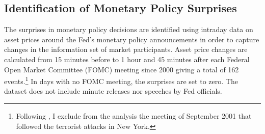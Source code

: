 {\subsection{Identification of Monetary Policy Surprises} \label{sec:USMPS}
\iftoggle{toclinks}{\gototoc}{} %


The surprises in monetary policy decisions are identified using intraday data on asset prices around the Fed's monetary policy announcements in order to capture changes in the information set of market participants. %
Asset price changes are calculated from 15 minutes before to 1 hour and 45 minutes after each Federal Open Market Committee (FOMC) meeting since 2000 giving a total of 162 events.\footnote{ Following \cite{GSS:2005a}, I exclude from the analysis the meeting of September 2001 that followed the terrorist attacks in New York.}
In days with no FOMC meeting, the surprises are set to zero.
The dataset does not include minute releases nor speeches by Fed officials. 

}
